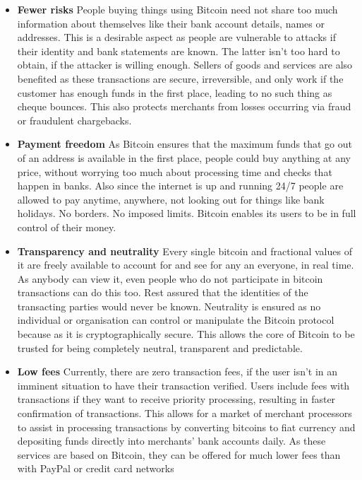 \documentclass[12pt,a4paper]{report}
\begin{document}
\begin{flushleft}
\begin{itemize}

 \item \textbf{Fewer risks} \newline People buying things using Bitcoin need not share too much information about themselves like their bank account details, names or addresses. This is a desirable aspect as people are vulnerable to attacks if their identity and bank statements are known. \newline 
 The latter isn't too hard  to obtain, if the attacker is willing enough.
 Sellers of goods and services are also benefited as these transactions are secure, irreversible, and only work if the customer has enough funds in the first place, leading to no such thing as cheque bounces. This also protects merchants from losses occurring via fraud or fraudulent chargebacks.
  
  \vspace{10mm}
  \item \textbf{Payment freedom} \newline
  As Bitcoin ensures that the maximum funds that go out of an address is available in the first place, people could buy anything at any price, without worrying too much about processing time and checks that happen in banks. Also since the internet is up and running 24/7 people are allowed to pay anytime, anywhere, not looking out for things like bank holidays. No borders. No imposed limits. Bitcoin enables its users to be in full control of their money.
  \vspace{10mm}

 \item \textbf{Transparency and neutrality} \newline 
 Every single bitcoin and fractional values of it are freely available to account for and see for any an everyone, in real time. As anybody can view it, even people who do not participate in bitcoin transactions can do this too. Rest assured that the identities of the transacting parties would never be known.\newline
 Neutrality is ensured as no individual or organisation can control or manipulate the Bitcoin protocol because as it is cryptographically secure. This allows the core of Bitcoin to be trusted for being completely neutral, transparent and predictable.
 
  \vspace{10mm}
 
  
  \item \textbf{Low fees} \newline 
  Currently, there are zero transaction fees, if the user isn't in an imminent situation to have their transaction verified. Users include fees with transactions if they want to receive priority processing, resulting in faster confirmation of transactions. This allows for a market of merchant processors to assist in processing transactions by converting bitcoins to fiat currency and depositing funds directly into merchants' bank accounts daily. As these services are based on Bitcoin, they can be offered for much lower fees than with PayPal or credit card networks
  

\end{itemize}
\end{flushleft}
\end{document}
